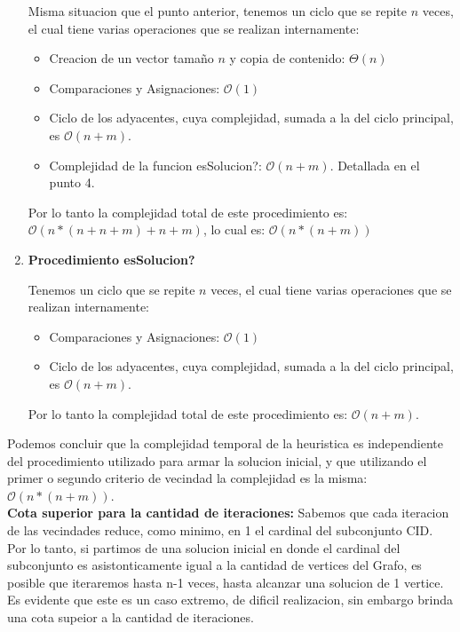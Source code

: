 \begin{enumerate}
    Misma situacion que el punto anterior, tenemos un ciclo que se repite $n$ veces, el cual tiene varias operaciones que se realizan internamente:
  \begin{itemize}
    \item Creacion de un vector tamaño $n$ y copia de contenido: $\Theta{(n)}$
    \item Comparaciones y Asignaciones: $\mathcal{O}(1)$
    \item Ciclo de los adyacentes, cuya complejidad, sumada a la del ciclo principal, es $\mathcal{O}(n + m)$.
    \item Complejidad de la funcion esSolucion?: $\mathcal{O}(n + m)$. Detallada en el punto 4.
  \end{itemize}
  Por lo tanto la complejidad total de este procedimiento es: $\mathcal{O}(n*(n + n + m) + n + m)$, lo cual es: $\mathcal{O}(n*(n + m))$
  
  \item \textbf{Procedimiento esSolucion?}
  
    Tenemos un ciclo que se repite $n$ veces, el cual tiene varias operaciones que se realizan internamente:
  \begin{itemize}
    \item Comparaciones y Asignaciones: $\mathcal{O}(1)$
    \item Ciclo de los adyacentes, cuya complejidad, sumada a la del ciclo principal, es $\mathcal{O}(n + m)$.
  \end{itemize}
  Por lo tanto la complejidad total de este procedimiento es: $\mathcal{O}(n + m)$.
  
\end{enumerate}

Podemos concluir que la complejidad temporal de la heuristica es independiente del procedimiento utilizado para armar la solucion inicial, y que utilizando el primer o segundo criterio de vecindad la complejidad es la misma: $\mathcal{O}(n*(n + m))$.\\ 

\textbf{Cota superior para la cantidad de iteraciones:}
Sabemos que cada iteracion de las vecindades reduce, como minimo, en 1 el cardinal del subconjunto CID. Por lo tanto, si partimos de una solucion inicial en donde el cardinal del subconjunto es asistonticamente igual a la cantidad de vertices del Grafo, es posible que iteraremos hasta n-1 veces, hasta alcanzar una solucion de 1 vertice. Es evidente que este es un caso extremo, de dificil realizacion, sin embargo brinda una cota supeior a la cantidad de iteraciones.

